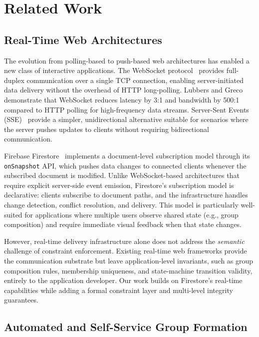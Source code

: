 \documentclass[11pt,a4paper]{article}
\theoremstyle{plain}
\theoremstyle{definition}
\theoremstyle{remark}
\begin{document}
\section{Related Work}
\label{sec:related}

\subsection{Real-Time Web Architectures}

The evolution from polling-based to push-based web architectures has enabled a new class of interactive applications. The WebSocket protocol~\cite{pimentel2012} provides full-duplex communication over a single TCP connection, enabling server-initiated data delivery without the overhead of HTTP long-polling. Lubbers and Greco~\cite{lubbers2010} demonstrate that WebSocket reduces latency by 3:1 and bandwidth by 500:1 compared to HTTP polling for high-frequency data streams. Server-Sent Events (SSE)~\cite{grigorik2013} provide a simpler, unidirectional alternative suitable for scenarios where the server pushes updates to clients without requiring bidirectional communication.

Firebase Firestore~\cite{firebase} implements a document-level subscription model through its \texttt{onSnapshot} API, which pushes data changes to connected clients whenever the subscribed document is modified. Unlike WebSocket-based architectures that require explicit server-side event emission, Firestore's subscription model is declarative: clients subscribe to document paths, and the infrastructure handles change detection, conflict resolution, and delivery. This model is particularly well-suited for applications where multiple users observe shared state (e.g., group composition) and require immediate visual feedback when that state changes.

However, real-time delivery infrastructure alone does not address the \emph{semantic} challenge of constraint enforcement. Existing real-time web frameworks provide the communication substrate but leave application-level invariants, such as group composition rules, membership uniqueness, and state-machine transition validity, entirely to the application developer. Our work builds on Firestore's real-time capabilities while adding a formal constraint layer and multi-level integrity guarantees.

\subsection{Automated and Self-Service Group Formation}
\end{document}
